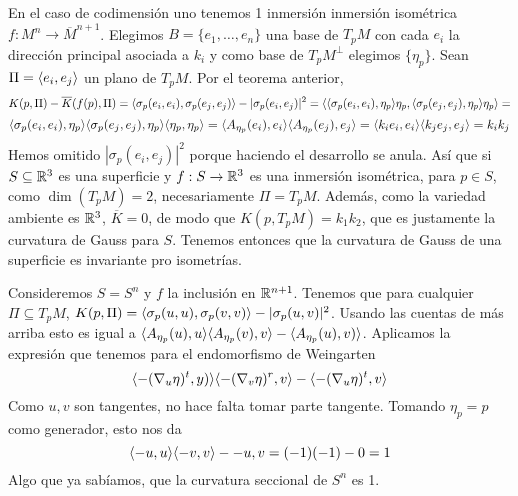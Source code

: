 \documentclass[GSR.tex]{subfiles}
\begin{document}
\begin{ej}
En el caso de codimensión uno tenemos 1 inmersión inmersión isométrica $f:M^n\to\overline{M}^{n+1}$. Elegimos $B=\{e_1,\dots, e_n\}$ una base de $T_pM$ con cada $e_i$ la dirección principal asociada a $k_i$ y como base de $T_pM^\perp$ elegimos $\{\eta_p\}$. Sean $\Pi=\langle{e_i,e_j}\rangle$ un plano de $T_pM$. Por el teorema anterior,
\[
K(p,\Pi)-\overline{K}(f(p),\Pi)=\langle{\sigma_p(e_i,e_i),\sigma_p(e_j,e_j)}\rangle-|\sigma_p(e_i,e_j)|^2=\langle{\langle{\sigma_p(e_i,e_i),\eta_p}\rangle\eta_p,\langle{\sigma_p(e_j,e_j),\eta_p}\rangle\eta_p}\rangle=
\] 
\[
\langle{\sigma_p(e_i,e_i),\eta_p}\rangle\langle{\sigma_p(e_j,e_j),\eta_p}\rangle\langle{\eta_p,\eta_p}\rangle=\langle{A_{\eta_p}(e_i),e_i}\rangle\langle{A_{\eta_p}(e_j),e_j}\rangle=\langle{k_ie_i,e_i}\rangle\langle{k_je_j,e_j}\rangle=k_ik_j
\]
Hemos omitido $|\sigma_p(e_i,e_j)|^2$ porque haciendo el desarrollo se anula. Así que si $S\subseteq\mathbb{R}^3$ es una superficie y $f:S\to\mathbb{R}^3$ es una inmersión isométrica, para $p\in S$, como $\dim(T_pM)=2$, necesariamente $\Pi=T_pM$. Además, como la variedad ambiente es $\mathbb{R}^3$, $\overline{K}=0$, de modo que $K(p,T_pM)=k_1k_2$, que es justamente la curvatura de Gauss para $S$. Tenemos entonces que la curvatura de Gauss de una superficie es invariante pro isometrías. 

Consideremos $S=S^n$ y $f$ la inclusión en $\mathbb{R}^{n+1}$. Tenemos que para cualquier $\Pi\subseteq T_pM$,  $K(p,\Pi)=\langle{\sigma_p(u,u),\sigma_p(v,v)}\rangle-|\sigma_p(u,v)|^2$. Usando las cuentas de más arriba esto es igual a $\langle{A_{\eta_p}(u),u}\rangle\langle{A_{\eta_p}(v),v}\rangle-\langle{A_{\eta_p}(u),v)}\rangle$. Aplicamos la expresión que tenemos para el endomorfismo de Weingarten
\[
\langle{-(\nabla_u\eta)^t,y)}\rangle\langle{-(\nabla_v\eta)^r,v}\rangle-\langle{-(\nabla_u\eta)^t,v}\rangle
\]
Como $u,v$ son tangentes, no hace falta tomar parte tangente. Tomando $\eta_p=p$ como generador, esto nos da
\[
\langle{-u,u}\rangle\langle{-v,v}\rangle-{-u,v}=(-1)(-1)-0=1
\]
Algo que ya sabíamos, que la curvatura seccional de $S^n$ es 1. 
\end{ej}
\end{document}
